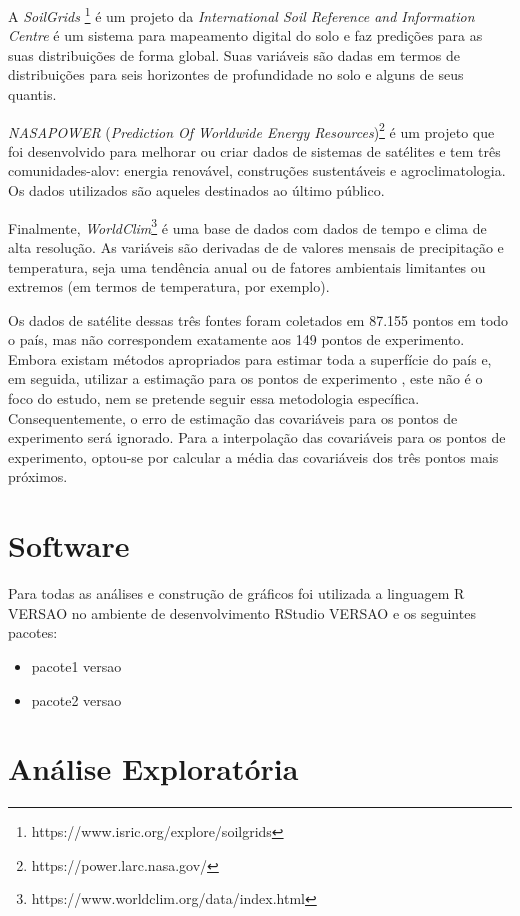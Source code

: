\documentclass[12pt, a4paper, twoside]{report}
\numberwithin{equation}{subsection} %
\begin{document}
A \textit{SoilGrids} \footnote{https://www.isric.org/explore/soilgrids} é um projeto da \textit{International Soil Reference and Information Centre} é um sistema para mapeamento digital do solo e faz predições  para as suas distribuições de forma global. Suas variáveis são dadas em termos de distribuições para seis horizontes de profundidade no solo e alguns de seus quantis.

\textit{NASAPOWER} (\textit{Prediction Of Worldwide Energy Resources})\footnote{https://power.larc.nasa.gov/} é um projeto que foi desenvolvido para melhorar ou criar dados de sistemas de satélites e tem três comunidades-alov: energia renovável, construções sustentáveis e agroclimatologia. Os dados utilizados são aqueles destinados ao último público.

Finalmente, \textit{WorldClim}\footnote{https://www.worldclim.org/data/index.html} é uma base de dados com dados de tempo e clima de alta resolução. As variáveis são derivadas de de valores mensais de precipitação e temperatura, seja uma tendência anual ou de fatores ambientais limitantes ou extremos (em termos de temperatura, por exemplo).

Os dados de satélite dessas três fontes foram coletados em 87.155 pontos em todo o país, mas não correspondem exatamente aos 149 pontos de experimento. Embora existam métodos apropriados para estimar toda a superfície do país e, em seguida, utilizar a estimação para os pontos de experimento \citep{cokriging}, este não é o foco do estudo, nem se pretende seguir essa metodologia específica. Consequentemente, o erro de estimação das covariáveis para os pontos de experimento será ignorado. Para a interpolação das covariáveis para os pontos de experimento, optou-se por calcular a média das covariáveis dos três pontos mais próximos.


\section{Software}

Para todas as análises e construção de gráficos foi utilizada a linguagem R VERSAO no ambiente de desenvolvimento RStudio VERSAO e os seguintes pacotes:

\begin{itemize}
	\item pacote1 versao
	\item pacote2 versao
\end{itemize}


\section{Análise Exploratória}
\end{document}
